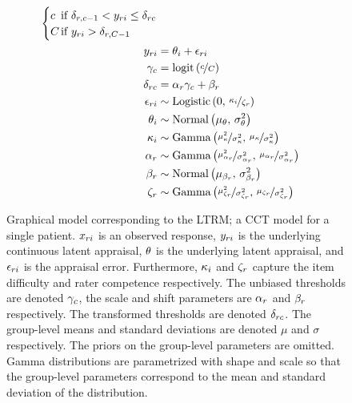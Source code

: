 \documentclass[a4paper,usenames,dvipsnames]{article}
\begin{document}
\begin{figure}[!ht]
\begin{minipage}{0.5\textwidth}
{\begin{align*}
\begin{cases}
			\Incat	&\hspace{-.3cm} \text{if } \Threshold_{\Irater, \Incat-1} < \Appraisal_{\Irater\Iitem} \leq \Threshold_{\Irater\Incat} \\
			\Tncat	&\hspace{-.3cm} \text{if } \Appraisal_{\Irater\Iitem} > \Threshold_{\Irater, \Tncat-1}
			\end{cases}\\
			\Appraisal_{\Irater\Iitem} &\assignment \ItemTruth_\Iitem + \Error_{\Irater\Iitem}\\
			\UnBiasedThreshold_\Incat &\assignment \logit{\nicefrac{\Incat}{\Tncat}}\\
			\Threshold_{\Irater\Incat} &\assignment \RaterScale_\Irater \gamma_\Incat + \RaterShift_\Irater\\
			\Error_{\Irater\Iitem}   &\sim \dlogis{0}{\nicefrac{\ItemDifficulty_\Iitem}{\RaterCompetence_\Irater}} \\
			\ItemTruth_\Iitem        &\sim \dnorm{\mu_\ItemTruth}{\sigma_\ItemTruth^2}\\
			\ItemDifficulty_\Iitem   &\sim \dgammaMV{\mu_\ItemDifficulty}{\sigma_\ItemDifficulty^2} \\
			\RaterScale_\Irater      &\sim \dgammaMV{\mu_{\RaterScale_\Irater}}{\sigma_{\RaterScale_\Irater}^2} \\
			\RaterShift_\Irater      &\sim \dnorm{\mu_{\RaterShift_\Irater}}{\sigma_{\RaterShift_\Irater}^2} \\
			\RaterCompetence_\Irater &\sim \dgammaMV{\mu_{\RaterCompetence_\Irater}}{\sigma_{\RaterCompetence_\Irater}^2} \\
		\end{align*}
		}%
	\end{minipage}
	\caption{Graphical model corresponding to the LTRM; a CCT model for a single patient. $x_{ri}$ is an observed response, $y_{ri}$ is the underlying continuous latent appraisal, $\theta$ is the underlying latent appraisal, and $\epsilon_{ri}$ is the appraisal error. Furthermore, $\kappa_i$ and $\zeta_r$ capture the item difficulty and rater competence respectively. The unbiased thresholds are denoted $\gamma_c$, the scale and shift parameters are $\alpha_r$ and $\beta_r$ respectively. The transformed thresholds are denoted $\delta_{rc}$. The group-level means and standard deviations are denoted $\mu$ and $\sigma$ respectively. The priors on the group-level parameters are omitted. Gamma distributions are parametrized with shape and scale so that the group-level parameters correspond to the mean and standard deviation of the distribution.}
	\label{model:LTRM}
\end{figure}
\end{document}
